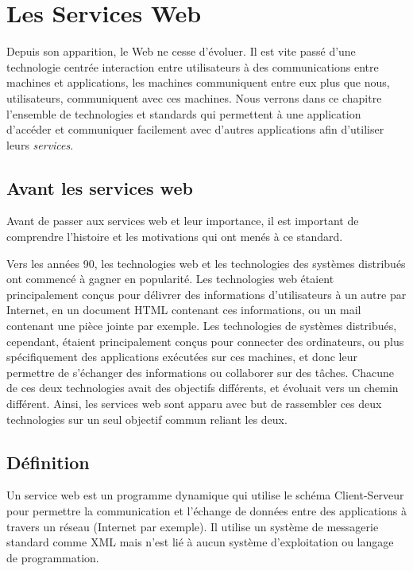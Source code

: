\chapter{Les Services Web}

Depuis son apparition, le Web ne cesse d'évoluer. Il est vite passé d'une technologie centrée interaction entre utilisateurs à des communications entre machines et applications, les machines communiquent entre eux plus que nous, utilisateurs, communiquent avec ces machines.
Nous verrons dans ce chapitre l'ensemble de technologies et standards qui permettent à une application d'accéder et communiquer facilement avec d'autres applications afin d'utiliser leurs \emph{services}.
		
\section{Avant les services web}
Avant de passer aux services web et leur importance, il est important de comprendre l'histoire et les motivations qui ont menés à ce standard.
		
Vers les années 90, les technologies web et les technologies des systèmes distribués ont commencé à gagner en popularité. Les technologies web étaient principalement conçus pour délivrer des informations d'utilisateurs à un autre par Internet, en un document HTML contenant ces informations, ou un mail contenant une pièce jointe par exemple. Les technologies de systèmes distribués, cependant, étaient principalement conçus pour connecter des ordinateurs, ou plus spécifiquement des applications exécutées sur ces machines, et donc leur permettre de s'échanger des informations ou collaborer sur des tâches.
Chacune de ces deux technologies avait des objectifs différents, et évoluait vers un chemin différent. Ainsi, les services web sont apparu avec but de rassembler ces deux technologies sur un seul objectif commun reliant les deux.\cite{W3Road}

\section{Définition}
Un service web est un programme dynamique qui utilise le schéma Client-Serveur pour permettre la communication et l'échange de données entre des applications à travers un réseau (Internet par exemple).
Il utilise un système de messagerie standard comme XML mais n'est lié à aucun système d'exploitation ou langage de programmation.

